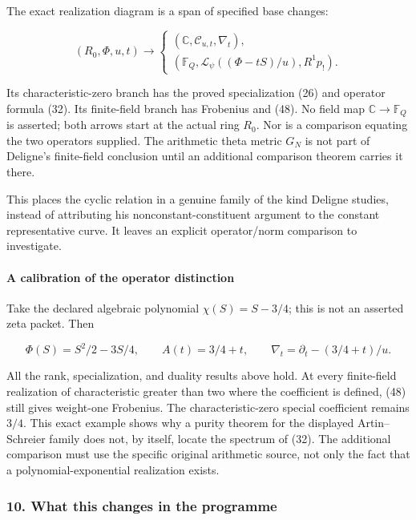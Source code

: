 The exact realization diagram is a span of specified base changes:

\[
(R_0,\Phi,u,t)\longrightarrow
\begin{cases}
(\mathbb C,\mathcal C_{u,t},\nabla_t),\\
(\mathbb F_Q,\mathcal L_\psi((\Phi-tS)/u),R^1p_!).
\end{cases}
\tag{49}
\]

Its characteristic-zero branch has the proved specialization (26) and operator formula (32). Its finite-field branch has Frobenius and (48). No field map \(\mathbb C\to\mathbb F_Q\) is asserted; both arrows start at the actual ring \(R_0\). Nor is a comparison equating the two operators supplied. The arithmetic theta metric \(G_N\) is not part of Deligne's finite-field conclusion until an additional comparison theorem carries it there.

This places the cyclic relation in a genuine family of the kind Deligne studies, instead of attributing his nonconstant-constituent argument to the constant representative curve. It leaves an explicit operator/norm comparison to investigate.

\paragraph{A calibration of the operator distinction}\label{endpoint-exponential_original--a-calibration-of-the-operator-distinction}

Take the declared algebraic polynomial \(\chi(S)=S-3/4\); this is not an asserted zeta packet. Then

\[
\Phi(S)=S^2/2-3S/4,\qquad A(t)=3/4+t,
\qquad\nabla_t=\partial_t-(3/4+t)/u.
\tag{50}
\]

All the rank, specialization, and duality results above hold. At every finite-field realization of characteristic greater than two where the coefficient is defined, (48) still gives weight-one Frobenius. The characteristic-zero special coefficient remains \(3/4\). This exact example shows why a purity theorem for the displayed Artin--Schreier family does not, by itself, locate the spectrum of (32). The additional comparison must use the specific original arithmetic source, not only the fact that a polynomial-exponential realization exists.

\subsubsection{10. What this changes in the programme}\label{endpoint-exponential_original--what-this-changes-in-the-programme}

